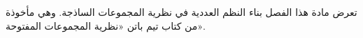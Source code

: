 \documentclass[../../../include/open-logic-section]{subfiles}
\begin{document}

\begin{editorial}
تعرض مادة هذا الفصل بناء النظم العددية في نظرية المجموعات الساذجة.
وهي مأخوذة من كتاب تيم باتن «نظرية المجموعات المفتوحة».
\end{editorial}


\OLEndChapterHook
\end{document}
